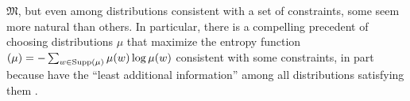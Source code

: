 \documentclass{article}
\theoremstyle{plain}
\theoremstyle{definition}
\theoremstyle{remark}
\let\H\relax
\DeclareMathOperator{\H}{\mathrm{H}} %
\newcommand{\dg}[1]{\mathfrak{#1}}
\numberwithin{equation}{section}
\begin{document}
		$\dg M$, but even among distributions consistent with a set of
        constraints, some seem more natural than others.
	In particular, there is a compelling precedent of
choosing distributions $\mu$ that maximize the entropy function
        $\H(\mu) = -\sum_{w \in \text{Supp($\mu$)}} \mu(w) \log \mu(w)$
consistent with some constraints,
	in part because have the ``least additional information''
        among all distributions satisfying 
		them
        \cite{jaynes1957information}. 
\end{document}
